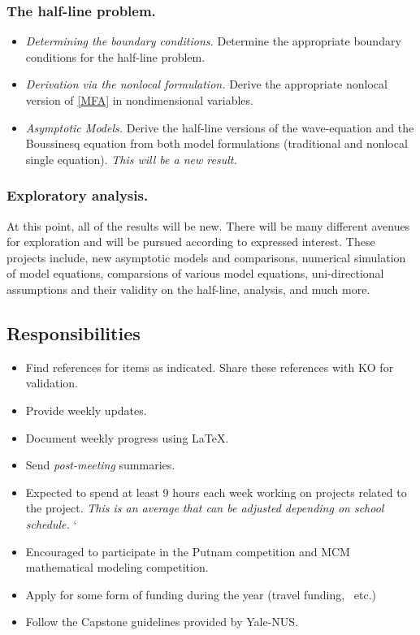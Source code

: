 \documentclass[a4paper,reqno]{article}
\begin{document}
        \subsubsection{The half-line problem.}
            \begin{itemize}
                \item \textit{Determining the boundary conditions.}  Determine the appropriate boundary conditions for the half-line problem.
                \item \textit{Derivation via the nonlocal formulation.}  Derive the appropriate nonlocal version of \eqref{MFA} in nondimensional variables.
                \item \textit{Asymptotic Models.} Derive the half-line versions of the wave-equation and the Boussinesq equation from both model formulations (traditional and nonlocal single equation).  \emph{This will be a new result.}
            \end{itemize}
        \subsubsection{Exploratory analysis.}
            At this point, all of the results will be new.  There will be many different avenues for exploration and will be pursued according to expressed interest.  These projects include, new asymptotic models and comparisons, numerical simulation of model equations, comparsions of various model equations, uni-directional assumptions and their validity on the half-line, analysis, and much more.  
    \subsection{Responsibilities}
        \begin{itemize}
            \item Find references for items as indicated.  Share these references with KO for validation.  
            \item Provide weekly updates.
            \item Document weekly progress using \LaTeX.
            \item Send \emph{post-meeting} summaries.
            \item Expected to spend at least 9 hours each week working on projects related to the project.  \emph{This is an average that can be adjusted depending on school schedule.}
        `   \item Encouraged to participate in the Putnam competition and MCM mathematical modeling competition.
            \item Apply for some form of funding during the year (travel funding, \ etc.)
            \item Follow the Capstone guidelines provided by Yale-NUS.
        \end{itemize}
\end{document}
